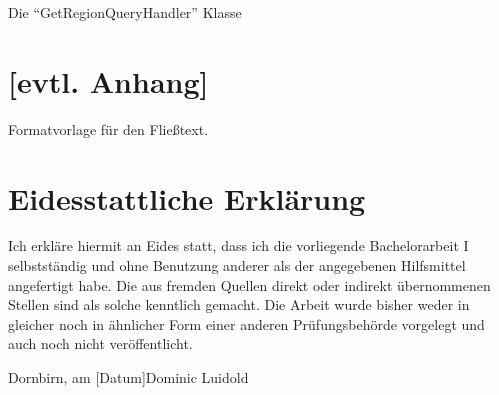 \documentclass[a4paper,12pt,twoside]{scrreprt}
\begin{document}
\begin{listing}[ht]
    \inputminted[fontsize=\footnotesize,linenos,breaklines]{php}{code/get_region_queryhandler.php}
    \caption[Die \enquote{GetRegionQueryHandler} Klasse]{Die \enquote{GetRegionQueryHandler} Klasse}
    \label{code:get-region-queryhandler}
\end{listing}

\clearpage
{}
{}
\printbibliography

\chapter*{[evtl. Anhang]} %
Formatvorlage für den Fließtext.

\chapter*{Eidesstattliche Erklärung}
Ich erkläre hiermit an Eides statt, dass ich die vorliegende Bachelorarbeit I selbstständig und ohne Benutzung anderer als der angegebenen Hilfsmittel angefertigt habe. Die aus fremden Quellen direkt oder indirekt übernommenen Stellen sind als solche kenntlich gemacht. Die Arbeit wurde bisher weder in gleicher noch in ähnlicher Form einer anderen Prüfungsbehörde vorgelegt und auch noch nicht veröffentlicht.

\vspace{3cm}
\noindent
Dornbirn, am [Datum]\hfill Dominic Luidold
\end{document}
